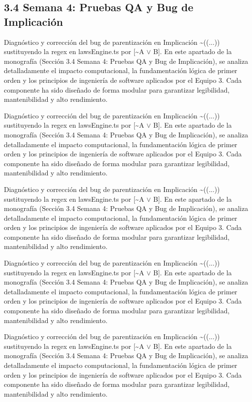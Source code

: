 \documentclass[11pt,a4paper]{article}
\begin{document}
\subsection{3.4 Semana 4: Pruebas QA y Bug de Implicación}

Diagnóstico y corrección del bug de parentización en Implicación
\textasciitilde{}((...)) sustituyendo la regex en lawsEngine.ts por [\textasciitilde{}A $ \lor $ B]. En este
apartado de la monografía (Sección 3.4 Semana 4: Pruebas QA y Bug de
Implicación), se analiza detalladamente el impacto computacional, la
fundamentación lógica de primer orden y los principios de ingeniería de
software aplicados por el Equipo 3. Cada componente ha sido diseñado de
forma modular para garantizar legibilidad, mantenibilidad y alto
rendimiento.

Diagnóstico y corrección del bug de parentización en Implicación
\textasciitilde{}((...)) sustituyendo la regex en lawsEngine.ts por [\textasciitilde{}A $ \lor $ B]. En este
apartado de la monografía (Sección 3.4 Semana 4: Pruebas QA y Bug de
Implicación), se analiza detalladamente el impacto computacional, la
fundamentación lógica de primer orden y los principios de ingeniería de
software aplicados por el Equipo 3. Cada componente ha sido diseñado de
forma modular para garantizar legibilidad, mantenibilidad y alto
rendimiento.

Diagnóstico y corrección del bug de parentización en Implicación
\textasciitilde{}((...)) sustituyendo la regex en lawsEngine.ts por [\textasciitilde{}A $ \lor $ B]. En este
apartado de la monografía (Sección 3.4 Semana 4: Pruebas QA y Bug de
Implicación), se analiza detalladamente el impacto computacional, la
fundamentación lógica de primer orden y los principios de ingeniería de
software aplicados por el Equipo 3. Cada componente ha sido diseñado de
forma modular para garantizar legibilidad, mantenibilidad y alto
rendimiento.

Diagnóstico y corrección del bug de parentización en Implicación
\textasciitilde{}((...)) sustituyendo la regex en lawsEngine.ts por [\textasciitilde{}A $ \lor $ B]. En este
apartado de la monografía (Sección 3.4 Semana 4: Pruebas QA y Bug de
Implicación), se analiza detalladamente el impacto computacional, la
fundamentación lógica de primer orden y los principios de ingeniería de
software aplicados por el Equipo 3. Cada componente ha sido diseñado de
forma modular para garantizar legibilidad, mantenibilidad y alto
rendimiento.

Diagnóstico y corrección del bug de parentización en Implicación
\textasciitilde{}((...)) sustituyendo la regex en lawsEngine.ts por [\textasciitilde{}A $ \lor $ B]. En este
apartado de la monografía (Sección 3.4 Semana 4: Pruebas QA y Bug de
Implicación), se analiza detalladamente el impacto computacional, la
fundamentación lógica de primer orden y los principios de ingeniería de
software aplicados por el Equipo 3. Cada componente ha sido diseñado de
forma modular para garantizar legibilidad, mantenibilidad y alto
rendimiento.
\end{document}
